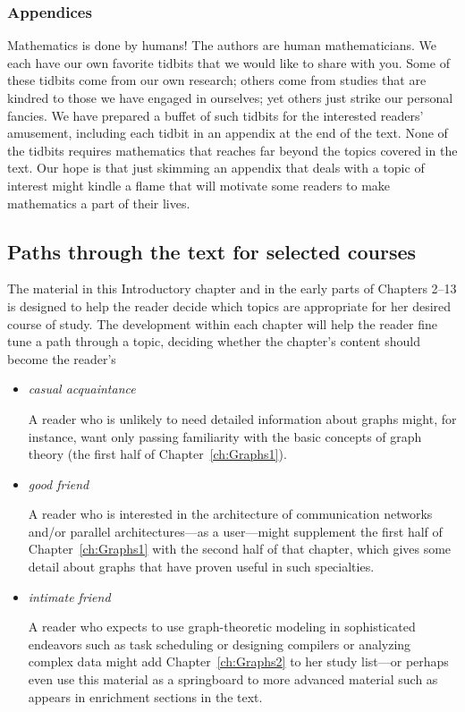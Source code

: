 \subsubsection{Appendices}

Mathematics is done by humans!  The authors are human mathematicians.  We each have our own favorite tidbits that we would like to share with you.  Some of these tidbits come from our own research; others come from studies that are kindred to those we have engaged in ourselves; yet others just strike our personal fancies.  We have prepared a buffet of such tidbits for the interested readers' amusement, including each tidbit in an appendix at the end of the text.  None of the tidbits requires mathematics that reaches far beyond the topics covered in the text.  Our hope is that just skimming an appendix that deals with a topic of interest might kindle a flame that will motivate some readers to make mathematics a part of their lives.


\subsection{Paths through the text for selected courses}

The material in this Introductory chapter and in the early parts of Chapters 2--13 is designed to help the reader decide which topics are appropriate for her desired course of study.  The development within each chapter will help the reader fine tune a path through a topic, deciding whether the chapter's content should become the reader's
\begin{itemize}
\item
{\em casual acquaintance}

\smallskip

A reader who is unlikely to need detailed information about graphs might, for instance, want only passing familiarity with the basic concepts of graph theory (the first half of Chapter~\ref{ch:Graphs1}).

\item
{\em good friend}

\smallskip

A reader who is interested in the architecture of communication networks and/or parallel architectures---as a user---might supplement the first half of Chapter~\ref{ch:Graphs1} with the second half of that chapter, which gives some detail about graphs that have proven useful in such specialties.

\item
{\em intimate friend}

\smallskip

A reader who expects to use graph-theoretic modeling in sophisticated endeavors such as task scheduling or designing compilers or analyzing complex data might add Chapter~\ref{ch:Graphs2} to her study list---or perhaps even use this material as a springboard to more advanced material such as appears in enrichment sections in the text.
\end{itemize}

